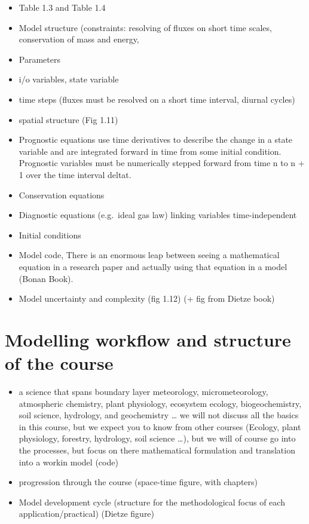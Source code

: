 \documentclass[
  oneside]{book}
\providecommand{\tightlist}{%
  \setlength{\itemsep}{0pt}\setlength{\parskip}{0pt}}
\begin{document}
\begin{itemize}
\tightlist
\item
  Table 1.3 and Table 1.4
\item
  Model structure (constraints: resolving of fluxes on short time scales, conservation of mass and energy,
\item
  Parameters
\item
  i/o variables, state variable
\item
  time steps (fluxes must be resolved on a short time interval, diurnal cycles)
\item
  spatial structure (Fig 1.11)
\item
  Prognostic equations use time derivatives to describe the change in a state variable and are integrated forward in time from some initial condition. Prognostic variables must be numerically stepped forward from time n to n + 1 over the time interval deltat.
\item
  Conservation equations
\item
  Diagnostic equations (e.g.~ideal gas law) linking variables time-independent
\item
  Initial conditions
\item
  Model code, There is an enormous leap between seeing a mathematical equation in a research paper and actually using that equation in a model (Bonan Book).
\item
  Model uncertainty and complexity (fig 1.12) (+ fig from Dietze book)
\end{itemize}

\hypertarget{modelling-workflow-and-structure-of-the-course}{%
\section{Modelling workflow and structure of the course}\label{modelling-workflow-and-structure-of-the-course}}

\begin{itemize}
\tightlist
\item
  a science that spans boundary layer meteorology, micrometeorology, atmospheric chemistry, plant physiology, ecosystem ecology, biogeochemistry, soil science, hydrology, and geochemistry \ldots{} we will not discuss all the basics in this course, but we expect you to know from other courses (Ecology, plant physiology, forestry, hydrology, soil science \ldots), but we will of course go into the processes, but focus on there mathematical formulation and translation into a workin model (code)
\item
  progression through the course (space-time figure, with chapters)
\item
  Model development cycle (structure for the methodological focus of each application/practical) (Dietze figure)
\end{itemize}
\end{document}
